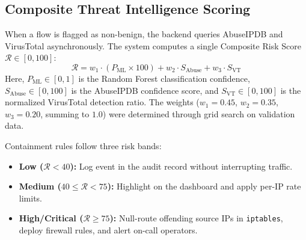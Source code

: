 \documentclass[conference]{IEEEtran}
\begin{document}
\begin{table}[htbp]
\caption{Random Forest Model Hyperparameters}
\label{tab:model_summary}
\centering
\small
{}
\end{table}

\subsection{Composite Threat Intelligence Scoring}
When a flow is flagged as non-benign, the backend queries AbuseIPDB and VirusTotal asynchronously. The system computes a single Composite Risk Score $\mathcal{R} \in [0, 100]$:
\begin{equation}
\mathcal{R} = w_1 \cdot (P_{\text{ML}} \times 100) + w_2 \cdot S_{\text{Abuse}} + w_3 \cdot S_{\text{VT}}
\end{equation}
Here, $P_{\text{ML}} \in [0, 1]$ is the Random Forest classification confidence, $S_{\text{Abuse}} \in [0, 100]$ is the AbuseIPDB confidence score, and $S_{\text{VT}} \in [0, 100]$ is the normalized VirusTotal detection ratio. The weights ($w_1 = 0.45$, $w_2 = 0.35$, $w_3 = 0.20$, summing to $1.0$) were determined through grid search on validation data.

Containment rules follow three risk bands:
\begin{itemize}
    \item \textbf{Low ($\mathcal{R} < 40$):} Log event in the audit record without interrupting traffic.
    \item \textbf{Medium ($40 \le \mathcal{R} < 75$):} Highlight on the dashboard and apply per-IP rate limits.
    \item \textbf{High/Critical ($\mathcal{R} \ge 75$):} Null-route offending source IPs in \texttt{iptables}, deploy firewall rules, and alert on-call operators.
\end{itemize}
\end{document}
